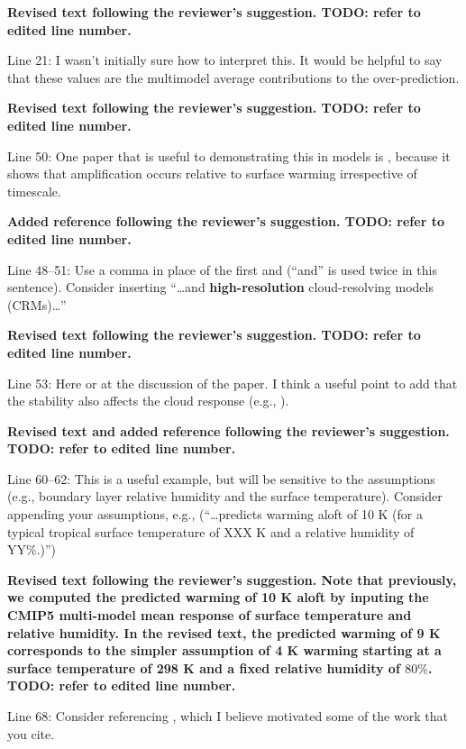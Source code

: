\documentclass[11pt]{article}
\begin{document}
\textbf{Revised text following the reviewer's suggestion. TODO: refer to edited line number.}

Line 21: I wasn't initially sure how to interpret this. It would be helpful to say that these values are the multimodel average contributions to the over-prediction.

\textbf{Revised text following the reviewer's suggestion. TODO: refer to edited line number.}

Line 50: One paper that is useful to demonstrating this in models is \cite{santer_amplification_2005}, because it shows that amplification occurs relative to surface warming irrespective of timescale.

\textbf{Added reference following the reviewer's suggestion. TODO: refer to edited line number.}

Line 48--51: Use a comma in place of the first and (``and'' is used twice in this sentence). Consider inserting ``\ldots{}and \textbf{high-resolution} cloud-resolving models (CRMs)\ldots{}''

\textbf{Revised text following the reviewer's suggestion. TODO: refer to edited line number.}

Line 53: Here or at the discussion of the \cite{andrews_dependence_2018} paper. I think a useful point to add that the stability also affects the cloud response (e.g., \cite{zhou_impact_2016}).

\textbf{Revised text and added reference following the reviewer's suggestion. TODO: refer to edited line number.}

Line 60--62: This is a useful example, but will be sensitive to the assumptions (e.g., boundary layer relative humidity and the surface temperature). Consider appending your assumptions, e.g., (``\ldots{}predicts warming aloft of 10 K (for a typical tropical surface temperature of XXX K and a relative humidity of YY\%.)'')

\textbf{Revised text following the reviewer's suggestion. Note that previously, we computed the predicted warming of 10 K aloft by inputing the CMIP5 multi-model mean response of surface temperature and relative humidity. In the revised text, the predicted warming of 9 K corresponds to the simpler assumption of 4 K warming starting at a surface temperature of 298 K and a fixed relative humidity of \(80\%\).  TODO: refer to edited line number.}

Line 68: Consider referencing \cite{sobel_enso_2002}, which I believe motivated some of the work that you cite.
\end{document}
